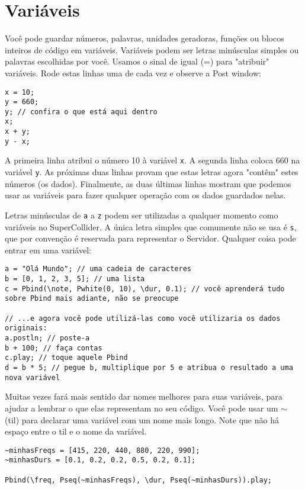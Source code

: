 \section{Variáveis}
\label{sec:variables}

Você pode guardar números, palavras, unidades geradoras, funções ou blocos inteiros de código em variáveis. Variáveis podem ser letras minúsculas simples ou palavras escolhidas por você. Usamos o sinal de igual (=) para "atribuir" variáveis. Rode estas linhas uma de cada vez e observe a Post window:

 
\begin{lstlisting}[style=SuperCollider-IDE, basicstyle=\scttfamily\footnotesize]
x = 10;
y = 660;
y; // confira o que está aqui dentro
x;
x + y;
y - x;
\end{lstlisting}
 

A primeira linha atribui o número 10 à variável \texttt{x}. A segunda linha coloca 660 na variável \texttt{y}. As próximas duas linhas provam que estas letras agora "contêm" estes números (os dados). Finalmente, as duas últimas linhas mostram que podemos usar as variáveis para fazer qualquer operação com os dados guardados nelas.

Letras minúsculas de \texttt{a} a \texttt{z} podem ser utilizadas a qualquer momento como variáveis no SuperCollider. A única letra simples que comumente não se usa é \texttt{s}, que por convenção é reservada para representar o Servidor. Qualquer coisa pode entrar em uma variável:
 
\begin{lstlisting}[style=SuperCollider-IDE, basicstyle=\scttfamily\footnotesize]
a = "Olá Mundo"; // uma cadeia de caracteres
b = [0, 1, 2, 3, 5]; // uma lista
c = Pbind(\note, Pwhite(0, 10), \dur, 0.1); // você aprenderá tudo sobre Pbind mais adiante, não se preocupe

// ...e agora você pode utilizá-las como você utilizaria os dados originais:
a.postln; // poste-a
b + 100; // faça contas
c.play; // toque aquele Pbind
d = b * 5; // pegue b, multiplique por 5 e atribua o resultado a uma nova variável
\end{lstlisting}

Muitas vezes fará mais sentido dar nomes melhores para suas variáveis, para ajudar a lembrar o que elas representam no seu código. Você pode usar um $\sim$ (til) para declarar uma variável com um nome mais longo. Note que não há espaço entre o til e o nome da variável.

\begin{lstlisting}[style=SuperCollider-IDE, basicstyle=\scttfamily\footnotesize]
~minhasFreqs = [415, 220, 440, 880, 220, 990];
~minhasDurs = [0.1, 0.2, 0.2, 0.5, 0.2, 0.1];

Pbind(\freq, Pseq(~minhasFreqs), \dur, Pseq(~minhasDurs)).play;
\end{lstlisting}
 

